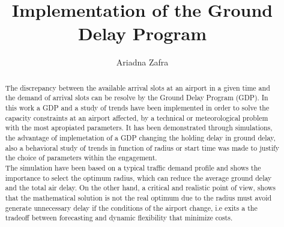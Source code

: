 \documentclass[final,1p]{elsarticle}
\begin{document}
\begin{frontmatter}



\title{Implementation of the Ground Delay Program}


\author[ad1]{Ariadna Zafra}

\address[ad1]{ariadna.zafra@estudiant.upc.edu EETAC-UPC Barcelona}



\begin{abstract}
The discrepancy between the available arrival slots at an airport in a given time and the demand of arrival slots can be resolve by the Ground Delay Program (GDP). In this work a GDP and a study of trends have been implemented in order to solve the capacity constraints at an airport affected, by a technical or meteorological problem with the most apropiated parameters. It has been demonstrated through simulations, the advantage of implemetation of a GDP changing the holding delay in ground delay, also a behavioral study of trends in function of radius or start time was made to justify the choice of parameters within the engagement.
\\

The simulation have been based on a typical traffic demand profile and shows the importance to select the optimum radius, which can reduce the average ground delay and the total air delay. On the other hand, a critical and realistic point of view, shows that the mathematical solution is not the real optimum due to the radius must avoid generate unnecessary delay if the conditions of the airport change, i.e exits a the tradeoff between forecasting and dynamic flexibility that minimize costs.


\end{abstract}
\end{frontmatter}
\end{document}
